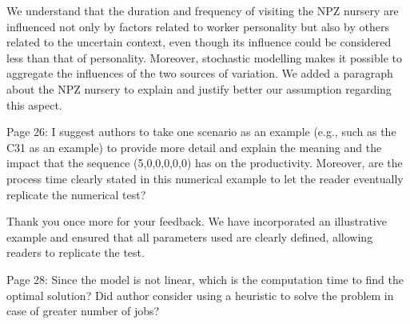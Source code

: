 \documentclass[preprint,11pt,3p]{elsarticle}
\begin{document}
\begin{tcolorbox}[colback=r_color1,colframe=r_color2,title=R12:]
We understand that the duration and frequency of visiting the NPZ nursery are influenced not only by factors related to worker personality but also by others related to the uncertain context, even though its influence could be considered less than that of personality. Moreover, stochastic modelling makes it possible to aggregate the influences of the two sources of variation. We added a paragraph about the NPZ nursery to explain and justify better our assumption regarding this aspect. 


\end{tcolorbox}
\begin{tcolorbox}[colback=q_color1,colframe=q_color2,title=Q13  :] Page 26: I suggest authors to take one scenario as an example (e.g., such as the C31 as an example) to provide more detail and explain the meaning and the impact that the sequence (5,0,0,0,0,0) has on the productivity. Moreover, are the process time clearly stated in this numerical example to let the reader eventually replicate the numerical test?
\end{tcolorbox}

\begin{tcolorbox}[colback=r_color1,colframe=r_color2,title=R13:]
Thank you once more for your feedback. We have incorporated an illustrative example and ensured that all parameters used are clearly defined, allowing readers to replicate the test.
\end{tcolorbox}
\begin{tcolorbox}[colback=q_color1,colframe=q_color2,title=Q14  :] Page 28: Since the model is not linear, which is the computation time to find the optimal solution? Did author consider using a heuristic to solve the problem in case of greater number of jobs?
\end{tcolorbox}
\end{document}
